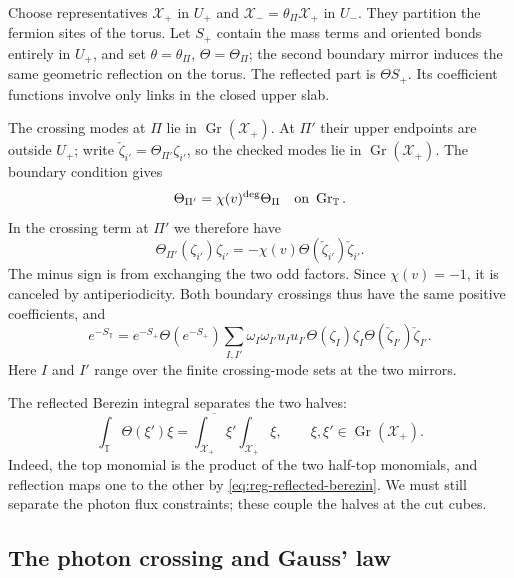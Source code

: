 Choose representatives $\mathcal X_+$ in $U_+$ and
$\mathcal X_-=\theta_\Pi\mathcal X_+$ in $U_-$. They partition the
fermion sites of the torus. Let $S_+$ contain the mass terms and
oriented bonds entirely in $U_+$, and set
$\theta=\theta_\Pi$, $\Theta=\Theta_\Pi$; the second boundary mirror
induces the same geometric reflection on the torus.
The reflected part is $\Theta S_+$. Its coefficient functions
involve only links in the closed upper slab.

The crossing modes at $\Pi$ lie in
$\operatorname{Gr}(\mathcal X_+)$. At $\Pi'$ their upper endpoints
are outside $U_+$; write
$\check\zeta_{i'}=\Theta_{\Pi'}\zeta_{i'}$, so the checked modes
lie in $\operatorname{Gr}(\mathcal X_+)$. The boundary condition gives
\begin{equation}\label{eq:reg-second-reflection}
 \Theta_{\Pi'}=\chi(v)^{\deg}\Theta_\Pi
                 \quad\hbox{on }\operatorname{Gr}_{\mathbb T}.
\end{equation}
In the crossing term at $\Pi'$ we therefore have
\[
 \Theta_{\Pi'}(\zeta_{i'})\zeta_{i'}
 =-\chi(v)\Theta(\check\zeta_{i'})\check\zeta_{i'}.
\]
The minus sign is from exchanging the two odd factors. Since
$\chi(v)=-1$, it is canceled by antiperiodicity. Both boundary
crossings thus have the same positive coefficients, and
\begin{equation}\label{eq:reg-two-crossings}
 e^{-S_{\mathbb T}}=e^{-S_+}\Theta(e^{-S_+})
 \sum_{I,I'}\omega_I\omega_{I'}u_Iu_{I'}
       \Theta(\zeta_I)\zeta_I
       \Theta(\check\zeta_{I'})\check\zeta_{I'}.
\end{equation}
Here $I$ and $I'$ range over the finite crossing-mode sets at the
two mirrors.

The reflected Berezin integral separates the two halves:
\begin{equation}\label{eq:reg-half-berezin}
 \int_{\mathbb T}\Theta(\xi')\xi
 =\overline{\int_{\mathcal X_+}\xi'}
                  \int_{\mathcal X_+}\xi,
 \qquad \xi,\xi'\in\operatorname{Gr}(\mathcal X_+).
\end{equation}
Indeed, the top monomial is the product of the two half-top
monomials, and reflection maps one to the other by
\eqref{eq:reg-reflected-berezin}. We must still separate the photon
flux constraints; these couple the halves at the cut cubes.

\subsection{The photon crossing and Gauss' law}\label{subsec:reg-gauss}

